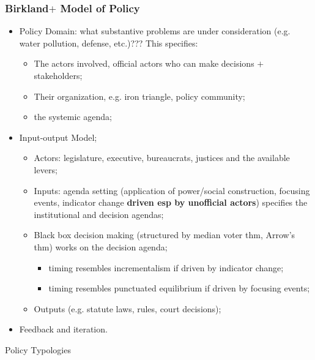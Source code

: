 \documentclass[aspectratio=169]{beamer}
\theoremstyle{principle}
\begin{document}
\begin{frame}
\frametitle{Birkland$+$ Model of Policy}
\begin{itemize}
\item Policy Domain: what substantive problems are under consideration (e.g. water pollution, defense, etc.)???  This specifies:
\begin{itemize}
\item The actors involved, official actors who can make decisions $+$ stakeholders; 
\item Their organization, e.g. iron triangle, policy community;
\item the systemic agenda; 
\end{itemize} 
\bigskip
\item \color{black}Input-output Model;
\begin{itemize}
\item Actors: legislature, executive, bureaucrats, justices and the available levers;
\item Inputs: agenda setting (application of power/social construction, focusing events, indicator change \textbf{driven esp by unofficial actors}) specifies the institutional and decision agendas;
\item Black box decision making (structured by median voter thm, Arrow's thm) works on the decision agenda;
\begin{itemize}
\item timing resembles incrementalism if driven by indicator change;
\item timing resembles punctuated equilibrium if driven by focusing events;
 \end{itemize}
\item Outputs (e.g. statute laws, rules, court decisions);
\end{itemize}
\bigskip
\item Feedback and iteration.
\end{itemize}
\end{frame}

\begin{frame}
\begin{center}
\Huge Policy Typologies
\end{center}
\end{frame}

\end{document}
